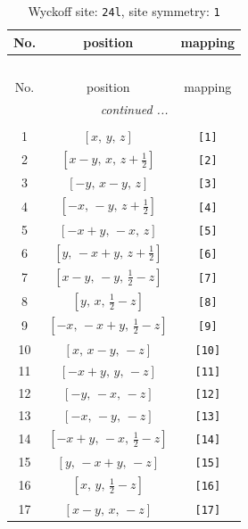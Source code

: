\documentclass[fleqn,8pt]{jsarticle}
\begin{document}
\begin{longtable}{ccc}
\caption{Wyckoff site: {\tt 24l}, site symmetry: {\tt 1}}
 \\
 \hline \hline
No. & position & mapping \\ \hline \endfirsthead

\multicolumn{2}{l}{\tablename\ \thetable{}} \\
 \hline \hline
No. & position & mapping \\ \hline \endhead

 \hline \hline
\multicolumn{2}{r}{\footnotesize\it continued ...} \\ \endfoot

 \hline \hline
\multicolumn{2}{r}{} \\ \endlastfoot

1 & $\left[ x,\, y,\, z \right]$ & {\tt [1]} \\ \hline
2 & $\left[ x - y,\, x,\, z + \frac{1}{2} \right]$ & {\tt [2]} \\ \hline
3 & $\left[ - y,\, x - y,\, z \right]$ & {\tt [3]} \\ \hline
4 & $\left[ - x,\, - y,\, z + \frac{1}{2} \right]$ & {\tt [4]} \\ \hline
5 & $\left[ - x + y,\, - x,\, z \right]$ & {\tt [5]} \\ \hline
6 & $\left[ y,\, - x + y,\, z + \frac{1}{2} \right]$ & {\tt [6]} \\ \hline
7 & $\left[ x - y,\, - y,\, \frac{1}{2} - z \right]$ & {\tt [7]} \\ \hline
8 & $\left[ y,\, x,\, \frac{1}{2} - z \right]$ & {\tt [8]} \\ \hline
9 & $\left[ - x,\, - x + y,\, \frac{1}{2} - z \right]$ & {\tt [9]} \\ \hline
10 & $\left[ x,\, x - y,\, - z \right]$ & {\tt [10]} \\ \hline
11 & $\left[ - x + y,\, y,\, - z \right]$ & {\tt [11]} \\ \hline
12 & $\left[ - y,\, - x,\, - z \right]$ & {\tt [12]} \\ \hline
13 & $\left[ - x,\, - y,\, - z \right]$ & {\tt [13]} \\ \hline
14 & $\left[ - x + y,\, - x,\, \frac{1}{2} - z \right]$ & {\tt [14]} \\ \hline
15 & $\left[ y,\, - x + y,\, - z \right]$ & {\tt [15]} \\ \hline
16 & $\left[ x,\, y,\, \frac{1}{2} - z \right]$ & {\tt [16]} \\ \hline
17 & $\left[ x - y,\, x,\, - z \right]$ & {\tt [17]} \\ \hline

\end{longtable}
\end{document}
